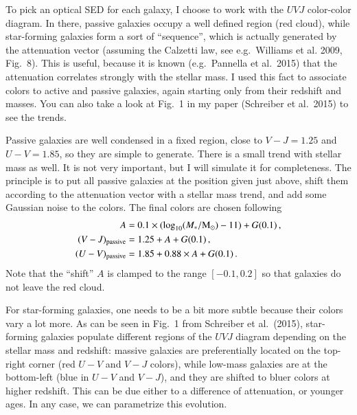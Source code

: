 \documentclass[12pt,a4paper]{article}
\newcommand{\msun}{{\rm M}_\odot}
\newcommand{\mstar}{M_\ast}
\newcommand{\uvj}{$UVJ$\xspace}
\begin{document}
To pick an optical SED for each galaxy, I choose to work with the \uvj color-color diagram. In there, passive galaxies occupy a well defined region (red cloud), while star-forming galaxies form a sort of ``sequence'', which is actually generated by the attenuation vector (assuming the Calzetti law, see e.g.~Williams et al. 2009, Fig.~8). This is useful, because it is known (e.g.~Pannella et al.~2015) that the attenuation correlates strongly with the stellar mass. I used this fact to associate colors to active and passive galaxies, again starting only from their redshift and masses. You can also take a look at Fig.~1 in my paper (Schreiber et al.~2015) to see the trends.

Passive galaxies are well condensed in a fixed region, close to $V-J = 1.25$ and $U-V = 1.85$, so they are simple to generate. There is a small trend with stellar mass as well. It is not very important, but I will simulate it for completeness. The principle is to put all passive galaxies at the position given just above, shift them according to the attenuation vector with a stellar mass trend, and add some Gaussian noise to the colors. The final colors are chosen following
\begin{align}
A &= 0.1 \times (\log_{10}(\mstar/\msun) - 11) + G(0.1)\,, \\
(V-J)_{\rm passive} &= 1.25 + A + G(0.1)\,, \\
(U-V)_{\rm passive} &= 1.85 + 0.88 \times A + G(0.1)\,.
\end{align}
Note that the ``shift'' $A$ is clamped to the range $[-0.1,0.2]$ so that galaxies do not leave the red cloud.

For star-forming galaxies, one needs to be a bit more subtle because their colors vary a lot more. As can be seen in Fig.~1 from Schreiber et al.~(2015), star-forming galaxies populate different regions of the \uvj diagram depending on the stellar mass and redshift: massive galaxies are preferentially located on the top-right corner (red $U-V$ and $V-J$ colors), while low-mass galaxies are at the bottom-left (blue in $U-V$ and $V-J$), and they are shifted to bluer colors at higher redshift. This can be due either to a difference of attenuation, or younger ages. In any case, we can parametrize this evolution.
\end{document}

